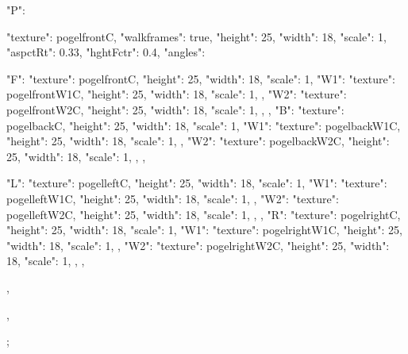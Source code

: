 {  "P": {
    "texture": pogelfrontC,
    "walkframes": true,
    "height": 25,
    "width": 18,
    "scale": 1,
    "aspctRt": 0.33,
    "hghtFctr": 0.4,
    "angles":{
      "F": {
        "texture": pogelfrontC,
        "height": 25,
        "width": 18,
        "scale": 1,
        "W1": {
          "texture": pogelfrontW1C,
          "height": 25,
          "width": 18,
          "scale": 1,
        },
        "W2": {
          "texture": pogelfrontW2C,
          "height": 25,
          "width": 18,
          "scale": 1,
        },
      },
      "B": {
        "texture": pogelbackC,
        "height": 25,
        "width": 18,
        "scale": 1,
        "W1": {
          "texture": pogelbackW1C,
          "height": 25,
          "width": 18,
          "scale": 1,
        },
        "W2": {
          "texture": pogelbackW2C,
          "height": 25,
          "width": 18,
          "scale": 1,
        },
      },

      "L": {
        "texture": pogelleftC,
        "height": 25,
        "width": 18,
        "scale": 1,
        "W1": {
          "texture": pogelleftW1C,
          "height": 25,
          "width": 18,
          "scale": 1,
        },
        "W2": {
          "texture": pogelleftW2C,
          "height": 25,
          "width": 18,
          "scale": 1,
        },
      },
      "R": {
        "texture": pogelrightC,
        "height": 25,
        "width": 18,
        "scale": 1,
        "W1": {
          "texture": pogelrightW1C,
          "height": 25,
          "width": 18,
          "scale": 1,
        },
        "W2": {
          "texture": pogelrightW2C,
          "height": 25,
          "width": 18,
          "scale": 1,
        },
      },
    },
  },
};